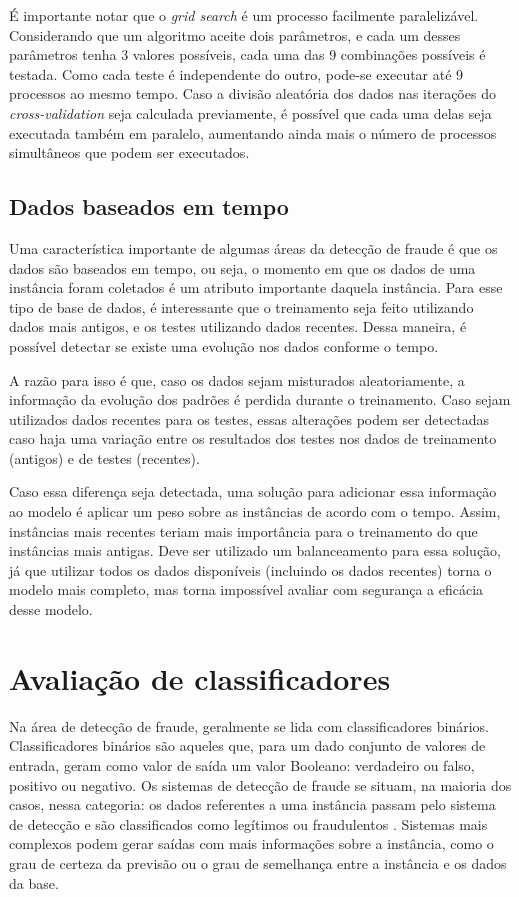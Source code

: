 É importante notar que o \emph{grid search} é um processo facilmente paralelizável. Considerando que um algoritmo aceite dois parâmetros, e cada um desses parâmetros tenha 3 valores possíveis, cada uma das 9 combinações possíveis é testada. Como cada teste é independente do outro, pode-se executar até 9 processos ao mesmo tempo. Caso a divisão aleatória dos dados nas iterações do \emph{cross-validation} seja calculada previamente, é possível que cada uma delas seja executada também em paralelo, aumentando ainda mais o número de processos simultâneos que podem ser executados.

\subsection{Dados baseados em tempo}

Uma característica importante de algumas áreas da detecção de fraude é que os dados são baseados em tempo, ou seja, o momento em que os dados de uma instância foram coletados é um atributo importante daquela instância. Para esse tipo de base de dados, é interessante que o treinamento seja feito utilizando dados mais antigos, e os testes utilizando dados recentes. Dessa maneira, é possível detectar se existe uma evolução nos dados conforme o tempo.

A razão para isso é que, caso os dados sejam misturados aleatoriamente, a informação da evolução dos padrões é perdida durante o treinamento. Caso sejam utilizados dados recentes para os testes, essas alterações podem ser detectadas caso haja uma variação entre os resultados dos testes nos dados de treinamento (antigos) e de testes (recentes).

Caso essa diferença seja detectada, uma solução para adicionar essa informação ao modelo é aplicar um peso sobre as instâncias de acordo com o tempo. Assim, instâncias mais recentes teriam mais importância para o treinamento do que instâncias mais antigas. Deve ser utilizado um balanceamento para essa solução, já que utilizar todos os dados disponíveis (incluindo os dados recentes) torna o modelo mais completo, mas torna impossível avaliar com segurança a eficácia desse modelo.

\section{Avaliação de classificadores}

Na área de detecção de fraude, geralmente se lida com classificadores binários. Classificadores binários são aqueles que, para um dado conjunto de valores de entrada, geram como valor de saída um valor Booleano: verdadeiro ou falso, positivo ou negativo. Os sistemas de detecção de fraude se situam, na maioria dos casos, nessa categoria: os dados referentes a uma instância passam pelo sistema de detecção e são classificados como legítimos ou fraudulentos \cite{Bewick2004}. Sistemas mais complexos podem gerar saídas com mais informações sobre a instância, como o grau de certeza da previsão ou o grau de semelhança entre a instância e os dados da base.

